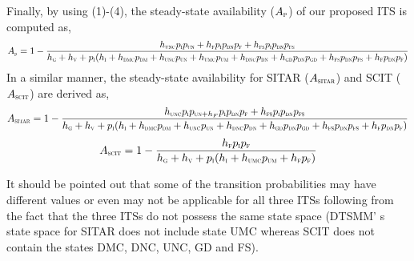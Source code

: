 \documentclass[preprint,number,12pt]{elsarticle}
\begin{document}
Finally, by using (1)-(4), the steady-state availability ($A_{\scalebox{0.5}P}$) of our proposed ITS is computed as,
\begin{equation}  \label{eq: proposed ITS availability}
A_{\scalebox{0.5}p} =1-\frac{h_{\scalebox{0.5}{UNC}}p_{\scalebox{0.5}{I}}p_{\scalebox{0.5}{UN}}+h_{\scalebox{0.5}{F}}p_{\scalebox{0.5}{I}}p_{\scalebox{0.5}{DN}}p_{\scalebox{0.5}{F}} +h_{\scalebox{0.5}{FS}}p_{\scalebox{0.5}{I}}p_{\scalebox{0.5}{DN}}p_{\scalebox{0.5}{FS}}}{h_{\scalebox{0.5}{G}}+h_{\scalebox{0.5}{V}}+p_{\scalebox{0.5}{I}}(h_{\scalebox{0.5}{I}}+h_{\scalebox{0.5}{DMC}}p_{\scalebox{0.5}{DM}}+h_{\scalebox{0.5}{UNC}}p_{\scalebox{0.5}{UN}}+h_{\scalebox{0.5}{UMC}}p_{\scalebox{0.5}{UM}} 
+h_{\scalebox{0.5}{DNC}}p_{\scalebox{0.5}{DN}}+h_{\scalebox{0.5}{GD}}p_{\scalebox{0.5}{DN}}p_{\scalebox{0.5}{GD}}+h_{\scalebox{0.5}{FS}} p_{\scalebox{0.5}{DN}}p_{\scalebox{0.5}{FS}}+ h_{\scalebox{0.5}{F}}p_{\scalebox{0.5}{DN}}p_{\scalebox{0.5}{F}})} 
\end{equation}
In a similar manner, the steady-state availability for SITAR ($A_{\scalebox{0.5}{SITAR}}$) and SCIT ($A_{\scalebox{0.5}{SCIT}}$) are derived as,
\begin{equation}\label{eq: SITAR availability}
A_{\scalebox{0.5}{SITAR}} = 1-
 \frac{h_{\scalebox{0.5}{UNC}}p_{\scalebox{0.5}{I}}p_{\scalebox{0.5}{UN}+h_{F}}p_{\scalebox{0.5}{I}}p_{\scalebox{0.5}{DN}}p_{\scalebox{0.5}{F}} +h_{\scalebox{0.5}{FS}}p_{\scalebox{0.5}{I}}p_{\scalebox{0.5}{DN}}p_{\scalebox{0.5}{FS}}}{h_{\scalebox{0.5}{G}}+h_{\scalebox{0.5}{V}}+p_{\scalebox{0.5}{I}}(h_{\scalebox{0.5}{I}}+h_{\scalebox{0.5}{DMC}}p_{\scalebox{0.5}{DM}}+h_{\scalebox{0.5}{UNC}}p_{\scalebox{0.5}{UN}}+
h_{\scalebox{0.5}{DNC}}p_{\scalebox{0.5}{DN}}
+ h_{\scalebox{0.5}{GD}}p_{\scalebox{0.5}{DN}}p_{\scalebox{0.5}{GD}}+ h_{\scalebox{0.5}{FS}}p_{\scalebox{0.5}{DN}}p_{\scalebox{0.5}{FS}} +h_{\scalebox{0.5}{F}}
p_{\scalebox{0.5}{DN}}p_{\scalebox{0.5}{F}})}
\end{equation}
\begin{equation} \label{eq: SCIT availability}
A_{\scalebox{0.5}{SCIT}} = 1-\frac{h_{\scalebox{0.5}{F}}p_{\scalebox{0.5}{I}}p_{\scalebox{0.5}{F}}}{h_{\scalebox{0.5}{G}}+h_{\scalebox{0.5}{V}}+p_{\scalebox{0.5}{I}}(h_{\scalebox{0.5}{I}}+h_{\scalebox{0.5}{UMC}}p_{\scalebox{0.5}{UM}}+h_{\scalebox{0.5}{F}}p_{\scalebox{0.5}{F}})}
\end{equation}

It should be pointed out that some of the transition probabilities may have different values or even may not be applicable for all three ITSs following from the fact that the three ITSs do not possess the same state space (DTSMM' s state space for SITAR does not include state UMC whereas SCIT does not contain the states DMC, DNC, UNC, GD and FS).
\end{document}
